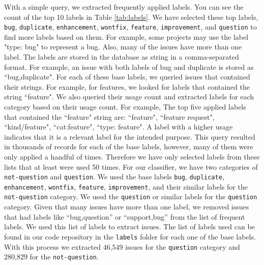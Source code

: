 \documentclass[conference]{IEEEtran}
\begin{document}
With a simple query, we extracted frequently applied labels. You 
can see the count of the top 10 labels in Table \ref{tab:labels}. 
We have selected these top labels, \verb|bug|, \verb|duplicate|, \verb|enhancement|, \verb|wontfix|,
\verb|feature|, \verb|improvement|, and \verb|question| to find more labels based on them.
For example, some projects may use the label "type: bug" to represent a bug. Also, many of the issues 
have more than one label. The labels are stored in the database as string in a comma-separated format. 
For example, an issue with both labels of bug and duplicate is stored as ``bug,duplicate". 
For each of these base labels, we queried issues that contained their strings. For example,
for features, we looked for labels that contained the string ``feature". We also queried their usage count and
extracted labels for each category based on their usage count.
For example, The top five applied labels that contained the ``feature" string 
are: ``feature", ``feature request", ``kind/feature", ``cat:feature", ``type: feature".
A label with a higher usage indicates that it is a relevant label for the intended purpose. This query resulted
in thousands of records for each of the base labels, however, many of them were only applied
a handful of times. Therefore we have only selected labels from these lists that 
at least were used 50 times. For our classifier, we have two categories of \verb|not-question| 
and \verb|question|. We used the base labels \verb|bug|, \verb|duplicate|, \verb|enhancement|, \verb|wontfix|,
\verb|feature|, \verb|improvement|, and their similar labels for the \verb|not-question| category. We used
the \verb|question| or similar labels for the \verb|question| category. Given that many issues have 
more than one label, we removed issues that had labels like ``bug,question'' or ``support,bug'' from 
the list of frequent labels. We used this list of labels to extract issues. The list of labels
used can be found in our code repository in the \verb|labels| folder for each one of the base labels.
With this process we extracted 46,549 issues for the \verb|question| category and 280,829 for 
the \verb|not-question|.
\end{document}
